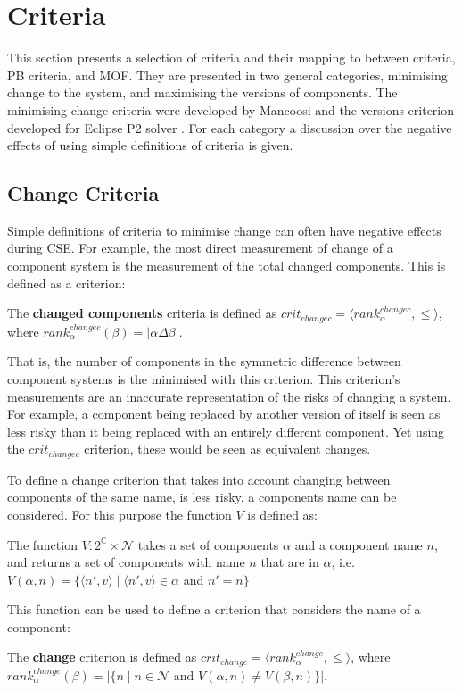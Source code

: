 \section{Criteria}
\label{impl.criteria}
This section presents a selection of criteria and their mapping to between \modelname criteria, PB criteria, and MOF.
They are presented in two general categories, minimising change to the system, and maximising the versions of components.
The minimising change criteria were developed by Mancoosi and the versions criterion developed for Eclipse P2 solver \citep{leBerre2010}.
For each category a discussion over the negative effects of using simple definitions of criteria is given.

\subsection{Change Criteria}
Simple definitions of criteria to minimise change can often have negative effects during CSE.
For example, the most direct measurement of change of a component system is the measurement of the total changed components.
This is defined as a \modelname criterion:
\begin{defs}
	The \textbf{changed components} criteria is defined as $crit_{changec} = \langle rank^{changec}_{\alpha}, \leq \rangle$,
	where $rank^{changec}_{\alpha}(\beta) = |\alpha \Delta \beta|$.
\end{defs}
That is, the number of components in the symmetric difference between component systems is the minimised with this criterion.
This criterion's measurements are an inaccurate representation of the risks of changing a system.
For example, a component being replaced by another version of itself is seen as less risky than it being replaced with an entirely different component.  
Yet using the $crit_{changec}$ criterion, these would be seen as equivalent changes.

To define a change criterion that takes into account changing between components of the same name, is less risky, a components name can be considered.
For this purpose the function $V$ is defined as: 
\begin{defs}
The function $V: 2^{\mathbb{C}} \times \mathcal{N}$ takes a set of components $\alpha$ and a component name $n$, and returns a set of components with name $n$ that are in $\alpha$,
i.e. $V(\alpha,n) = \{\langle n',v \rangle \mid \langle n',v \rangle \in \alpha $ and $ n' = n \}$
\end{defs}

This function can be used to define a criterion that considers the name of a component:
\begin{defs}
	The \textbf{change} criterion is defined as $crit_{change} = \langle rank^{change}_{\alpha}, \leq \rangle$,
	where $rank^{change}_{\alpha}(\beta) = |\{n \mid n \in \mathcal{N}$ and $V(\alpha,n) \neq V(\beta,n) \}|$.
\end{defs}

